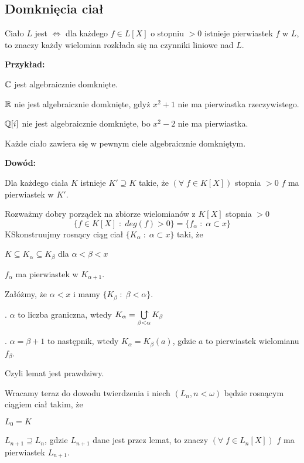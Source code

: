 \subsection{Domknięcia ciał}

Ciało $L$ jest  $\iff$ dla każdego $f\in L[X]$ o stopniu $>0$ istnieje pierwiastek $f$ w $L$, to znaczy każdy wielomian rozkłada się na czynniki liniowe nad $L$.

\textbf{Przykład:}

\indent \point $\mathbb{C}$ jest algebraicznie domknięte.

\indent \point $\mathbb{R}$ nie jest algebraicznie domknięte, gdyż $x^2+1$ nie ma pierwiastka rzeczywistego.

\indent \point $\mathbb{Q}[i]$ nie jest algebraicznie domknięte, bo $x^2-2$ nie ma pierwiastka.

\begin{tw}
    Każde ciało zawiera się w pewnym ciele algebraicznie domkniętym.
\end{tw}

\textbf{Dowód:}

 Dla każdego ciała $K$ istnieje $K'\supseteq K$ takie, że $(\forall\;f\in K[X])$ stopnia $>0$ $f$ ma pierwiastek w $K'$.

Rozważmy dobry porządek na zbiorze wielomianów z $K[X]$ stopnia $>0$
$$\{f\in K[X]\;:\;deg(f)>0\}=\{f_\alpha\;:\;\alpha\subset x\}$$
KSkonstruujmy rosnący ciąg ciał $\{K_\alpha\;:\;\alpha\subset x\}$ taki, że 

\indent \point $K\subseteq K_\alpha\subseteq K_\beta$ dla $\alpha<\beta< x$

\indent \point $f_\alpha$ ma pierwiastek w $K_{\alpha+1}$.

Załóżmy, że $\alpha<x$ i mamy $\{K_\beta\;:\;\beta<\alpha\}$.

. $\alpha$ to liczba graniczna, wtedy $K_\alpha=\ubigcup\limits_{\beta<\alpha}K_\beta$

. $\alpha=\beta+1$ to następnik, wtedy $K_\alpha=K_\beta(a)$, gdzie $a$ to pierwiastek wielomianu $f_\beta$.

Czyli lemat jest prawdziwy.

Wracamy teraz do dowodu twierdzenia i niech $(L_n,n<\omega)$ będzie rosnącym ciągiem ciał takim, że

\indent \point $L_0=K$

\indent \point $L_{n+1}\supseteq L_n$, gdzie $L_{n+1}$ dane jest przez lemat, to znaczy $(\forall\;f\in L_n[X])$ $f$ ma pierwiastek $L_{n+1}$.

